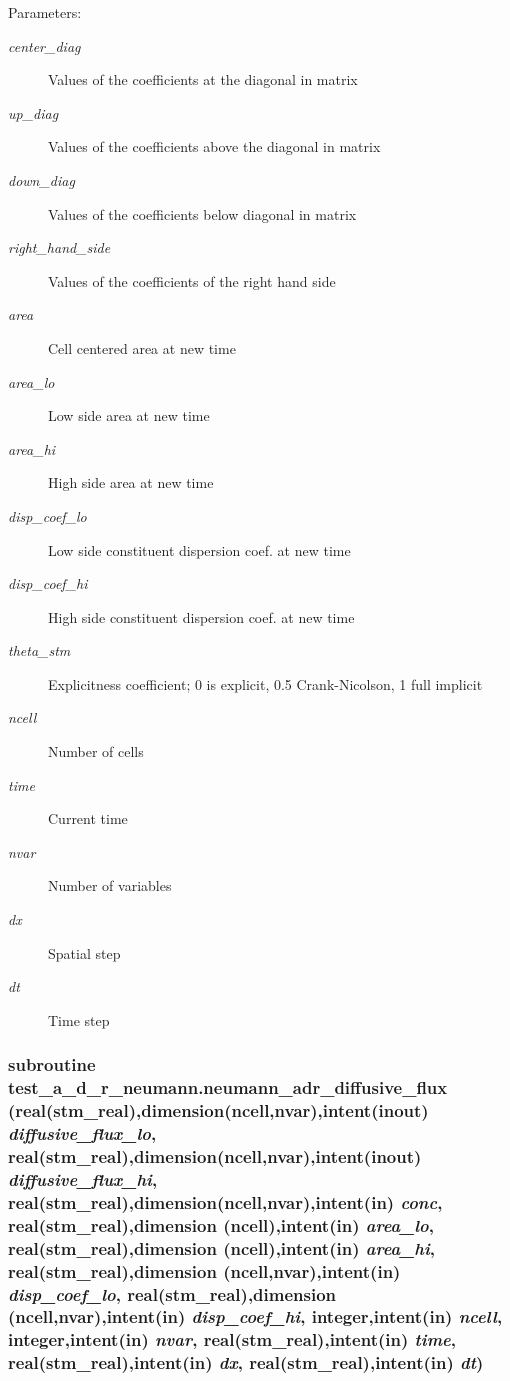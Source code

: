 \begin{Desc}
\item[Parameters:]
\begin{description}
\item[{\em center\_\-diag}]Values of the coefficients at the diagonal in matrix\item[{\em up\_\-diag}]Values of the coefficients above the diagonal in matrix\item[{\em down\_\-diag}]Values of the coefficients below diagonal in matrix\item[{\em right\_\-hand\_\-side}]Values of the coefficients of the right hand side\item[{\em area}]Cell centered area at new time \item[{\em area\_\-lo}]Low side area at new time\item[{\em area\_\-hi}]High side area at new time \item[{\em disp\_\-coef\_\-lo}]Low side constituent dispersion coef. at new time\item[{\em disp\_\-coef\_\-hi}]High side constituent dispersion coef. at new time\item[{\em theta\_\-stm}]Explicitness coefficient; 0 is explicit, 0.5 Crank-Nicolson, 1 full implicit \item[{\em ncell}]Number of cells\item[{\em time}]Current time\item[{\em nvar}]Number of variables\item[{\em dx}]Spatial step \item[{\em dt}]Time step \end{description}
\end{Desc}
\hypertarget{a00073_d74dc597fa06e3a626df2dd9a70c8d9d}{
\subsubsection[{neumann\_\-adr\_\-diffusive\_\-flux}]{\setlength{\rightskip}{0pt plus 5cm}subroutine test\_\-a\_\-d\_\-r\_\-neumann.neumann\_\-adr\_\-diffusive\_\-flux (real(stm\_\-real),dimension(ncell,nvar),intent(inout) {\em diffusive\_\-flux\_\-lo}, \/  real(stm\_\-real),dimension(ncell,nvar),intent(inout) {\em diffusive\_\-flux\_\-hi}, \/  real(stm\_\-real),dimension(ncell,nvar),intent(in) {\em conc}, \/  real(stm\_\-real),dimension         (ncell),intent(in) {\em area\_\-lo}, \/  real(stm\_\-real),dimension         (ncell),intent(in) {\em area\_\-hi}, \/  real(stm\_\-real),dimension (ncell,nvar),intent(in) {\em disp\_\-coef\_\-lo}, \/  real(stm\_\-real),dimension (ncell,nvar),intent(in) {\em disp\_\-coef\_\-hi}, \/  integer,intent(in) {\em ncell}, \/  integer,intent(in) {\em nvar}, \/  real(stm\_\-real),intent(in) {\em time}, \/  real(stm\_\-real),intent(in) {\em dx}, \/  real(stm\_\-real),intent(in) {\em dt})}}
\label{a00073_d74dc597fa06e3a626df2dd9a70c8d9d}


